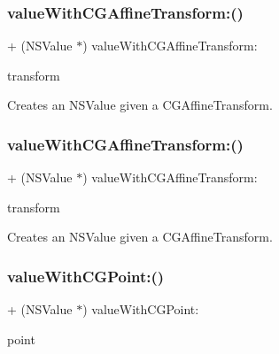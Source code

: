 \subsubsection{\texorpdfstring{value\+With\+C\+G\+Affine\+Transform\+:()}{valueWithCGAffineTransform:()}\hspace{0.1cm}{\footnotesize\ttfamily [2/3]}}
{\footnotesize\ttfamily + (N\+S\+Value $\ast$) value\+With\+C\+G\+Affine\+Transform\+: \begin{DoxyParamCaption}\item[{(C\+G\+Affine\+Transform)}]{transform }\end{DoxyParamCaption}}

Creates an N\+S\+Value given a C\+G\+Affine\+Transform. \mbox{\label{category_n_s_value_07_p_o_p_08_a53ee551bb88c3f52fe46d88483de46f0}} 
\subsubsection{\texorpdfstring{value\+With\+C\+G\+Affine\+Transform\+:()}{valueWithCGAffineTransform:()}\hspace{0.1cm}{\footnotesize\ttfamily [3/3]}}
{\footnotesize\ttfamily + (N\+S\+Value $\ast$) value\+With\+C\+G\+Affine\+Transform\+: \begin{DoxyParamCaption}\item[{(C\+G\+Affine\+Transform)}]{transform }\end{DoxyParamCaption}}

Creates an N\+S\+Value given a C\+G\+Affine\+Transform. \mbox{\label{category_n_s_value_07_p_o_p_08_a2ce45e92c1ce2993c147006249d7f4c1}} 
\subsubsection{\texorpdfstring{value\+With\+C\+G\+Point\+:()}{valueWithCGPoint:()}\hspace{0.1cm}{\footnotesize\ttfamily [1/3]}}
{\footnotesize\ttfamily + (N\+S\+Value $\ast$) value\+With\+C\+G\+Point\+: \begin{DoxyParamCaption}\item[{(C\+G\+Point)}]{point }\end{DoxyParamCaption}}

